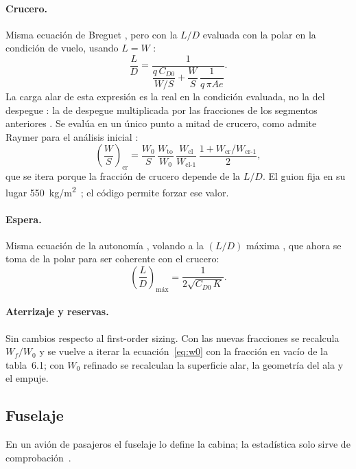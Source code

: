 \documentclass[11pt,a4paper]{article}
\newcommand{\WO}{W_0}
\begin{document}
\paragraph{Crucero.} Misma ecuación de Breguet \cite[ec.~6.11]{raymer6},
pero con la $L/D$ evaluada con la polar en la condición de vuelo, usando
$L=W$ \cite[ec.~6.13]{raymer6}:
\begin{equation}
  \frac{L}{D} = \frac{1}{\dfrac{q\,C_{D0}}{W/S} + \dfrac{W}{S}\,\dfrac{1}{q\,\pi A e}} .
\end{equation}
La carga alar de esta expresión es la real en la condición evaluada, no la del
despegue \cite[cap.~6]{raymer6}: la de despegue multiplicada por las fracciones
de los segmentos anteriores \cite[cap.~5]{raymer6}. Se evalúa en un único punto
a mitad de crucero, como admite Raymer para el análisis inicial
\cite[cap.~12]{raymer6}:
\begin{equation}
  \left(\frac{W}{S}\right)_\text{cr} = \frac{\WO}{S}\,
  \frac{W_\text{to}}{\WO}\,\frac{W_\text{cl}}{W_\text{cl-1}}\,
  \frac{1 + W_\text{cr}/W_\text{cr-1}}{2},
\end{equation}
que se itera porque la fracción de crucero depende de la $L/D$. El guion fija
en su lugar \SI{550}{kg/m^2}~\cite{guion}; el código permite forzar ese valor.

\paragraph{Espera.} Misma ecuación de la autonomía \cite[ec.~6.14]{raymer6},
volando a la $(L/D)$ máxima \cite[cap.~5]{raymer6}, que ahora se toma de la
polar para ser coherente con el crucero:
\begin{equation}
  \left(\frac{L}{D}\right)_\text{máx} = \frac{1}{2\sqrt{C_{D0}\,K}} .
\end{equation}

\paragraph{Aterrizaje y reservas.} Sin cambios respecto al first-order sizing. Con las nuevas fracciones se recalcula $W_f/\WO$ y se
vuelve a iterar la ecuación~\eqref{eq:w0} con la fracción en vacío de la
tabla~6.1; con $\WO$ refinado se recalculan la superficie alar, la geometría
del ala y el empuje.

\subsection{Fuselaje}
En un avión de pasajeros el fuselaje lo define la cabina; la estadística solo
sirve de comprobación~\cite{guion}.
\end{document}
